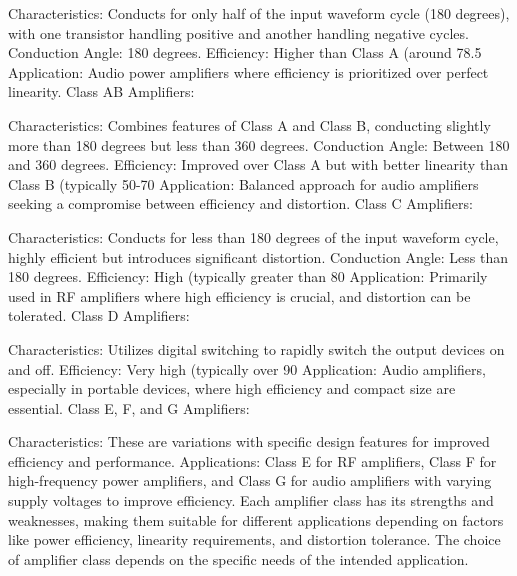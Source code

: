 Characteristics: Conducts for only half of the input waveform cycle (180 degrees), with one transistor handling positive and another handling negative cycles.
Conduction Angle: 180 degrees.
Efficiency: Higher than Class A (around 78.5%
Application: Audio power amplifiers where efficiency is prioritized over perfect linearity.
Class AB Amplifiers:

Characteristics: Combines features of Class A and Class B, conducting slightly more than 180 degrees but less than 360 degrees.
Conduction Angle: Between 180 and 360 degrees.
Efficiency: Improved over Class A but with better linearity than Class B (typically 50-70%
Application: Balanced approach for audio amplifiers seeking a compromise between efficiency and distortion.
Class C Amplifiers:

Characteristics: Conducts for less than 180 degrees of the input waveform cycle, highly efficient but introduces significant distortion.
Conduction Angle: Less than 180 degrees.
Efficiency: High (typically greater than 80%
Application: Primarily used in RF amplifiers where high efficiency is crucial, and distortion can be tolerated.
Class D Amplifiers:

Characteristics: Utilizes digital switching to rapidly switch the output devices on and off.
Efficiency: Very high (typically over 90%
Application: Audio amplifiers, especially in portable devices, where high efficiency and compact size are essential.
Class E, F, and G Amplifiers:

Characteristics: These are variations with specific design features for improved efficiency and performance.
Applications: Class E for RF amplifiers, Class F for high-frequency power amplifiers, and Class G for audio amplifiers with varying supply voltages to improve efficiency.
Each amplifier class has its strengths and weaknesses, making them suitable for different applications depending on factors like power efficiency, linearity requirements, and distortion tolerance. The choice of amplifier class depends on the specific needs of the intended application.